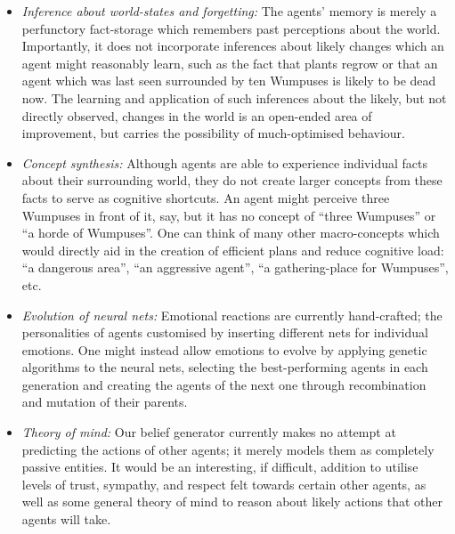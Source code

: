 \begin{itemize}
	 \item \emph{Inference about world-states and forgetting:} The agents' memory is merely a perfunctory fact-storage which remembers past perceptions about the world. Importantly, it does not incorporate inferences about likely changes which an agent might reasonably learn, such as the fact that plants regrow or that an agent which was last seen surrounded by ten Wumpuses is likely to be dead now. The learning and application of such inferences about the likely, but not directly observed, changes in the world is an open-ended area of improvement, but carries the possibility of much-optimised behaviour.
	 
	 \item \emph{Concept synthesis:} Although agents are able to experience individual facts about their surrounding world, they do not create larger concepts from these facts to serve as cognitive shortcuts. An agent might perceive three Wumpuses in front of it, say, but it has no concept of ``three Wumpuses'' or ``a horde of Wumpuses''. One can think of many other macro-concepts which would directly aid in the creation of efficient plans and reduce cognitive load: ``a dangerous area'', ``an aggressive agent'', ``a gathering-place for Wumpuses'', etc.
	 
	 \item \emph{Evolution of neural nets:} Emotional reactions are currently hand-crafted; the personalities of agents customised by inserting different nets for individual emotions. One might instead allow emotions to evolve by applying genetic algorithms to the neural nets, selecting the best-performing agents in each generation and creating the agents of the next one through recombination and mutation of their parents.
	 
	 \item \emph{Theory of mind:} Our belief generator currently makes no attempt at predicting the actions of other agents; it merely models them as completely passive entities. It would be an interesting, if difficult, addition to utilise levels of trust, sympathy, and respect felt towards certain other agents, as well as some general theory of mind to reason about likely actions that other agents will take.
\end{itemize}
